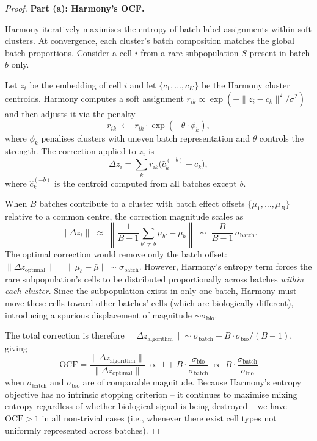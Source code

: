 \documentclass[11pt]{article}
\begin{document}
\begin{proof}
\textbf{Part (a): Harmony's OCF.}

Harmony iteratively maximises the entropy of batch-label assignments within
soft clusters.  At convergence, each cluster's batch composition matches
the global batch proportions.  Consider a cell $i$ from a rare
subpopulation $S$ present in batch $b$ only.

Let $z_i$ be the embedding of cell $i$ and let $\{c_1,\dots,c_K\}$ be the
Harmony cluster centroids.  Harmony computes a soft assignment
$r_{ik} \propto \exp(-\|z_i - c_k\|^2 / \sigma^2)$ and then adjusts it
via the penalty
\[
    r_{ik} \;\leftarrow\; r_{ik}\cdot\exp(-\theta \cdot \phi_k),
\]
where $\phi_k$ penalises clusters with uneven batch representation and
$\theta$ controls the strength.  The correction applied to $z_i$ is
\[
    \Delta z_i = \sum_k r_{ik}\bigl(\hat{c}_k^{(-b)} - c_k\bigr),
\]
where $\hat{c}_k^{(-b)}$ is the centroid computed from all batches except
$b$.

When $B$ batches contribute to a cluster with batch effect offsets
$\{\mu_1,\dots,\mu_B\}$ relative to a common centre, the correction
magnitude scales as
\[
    \|\Delta z_i\|
    \;\approx\; \left\|\frac{1}{B-1}\sum_{b'\ne b}\mu_{b'} - \mu_b\right\|
    \;\sim\; \frac{B}{B-1}\,\sigma_{\mathrm{batch}}.
\]
The optimal correction would remove only the batch offset:
$\|\Delta z_{\mathrm{optimal}}\| = \|\mu_b - \bar\mu\| \sim \sigma_{\mathrm{batch}}$.
However, Harmony's entropy term forces the rare subpopulation's cells to
be distributed proportionally across batches \emph{within each cluster}.
Since the subpopulation exists in only one batch, Harmony must move these
cells toward other batches' cells (which are biologically different),
introducing a spurious displacement of magnitude
$\sim\sigma_{\mathrm{bio}}$.

The total correction is therefore
$\|\Delta z_{\mathrm{algorithm}}\| \sim \sigma_{\mathrm{batch}} + B \cdot
\sigma_{\mathrm{bio}}/(B-1)$, giving
\[
    \mathrm{OCF}
    = \frac{\|\Delta z_{\mathrm{algorithm}}\|}{\|\Delta z_{\mathrm{optimal}}\|}
    \;\propto\; 1 + B\cdot\frac{\sigma_{\mathrm{bio}}}{\sigma_{\mathrm{batch}}}
    \;\propto\; B\cdot\frac{\sigma_{\mathrm{batch}}}{\sigma_{\mathrm{bio}}}
\]
when $\sigma_{\mathrm{batch}}$ and $\sigma_{\mathrm{bio}}$ are of
comparable magnitude.  Because Harmony's entropy objective has no
intrinsic stopping criterion -- it continues to maximise mixing entropy
regardless of whether biological signal is being destroyed -- we have
$\mathrm{OCF} > 1$ in all non-trivial cases (i.e., whenever there exist
cell types not uniformly represented across batches).


\end{proof}
\end{document}
